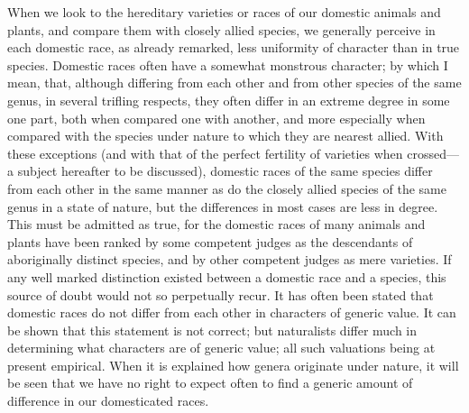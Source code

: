 When we look to the hereditary varieties or races of our
domestic animals and plants, and compare them with closely allied
species, we generally perceive in each domestic race, as already
remarked, less uniformity of character than in true species.
Domestic races often have a somewhat monstrous character; by which
I mean, that, although differing from each other and from other
species of the same genus, in several trifling respects, they often
differ in an extreme degree in some one part, both when compared
one with another, and more especially when compared with the
species under nature to which they are nearest allied. With these
exceptions (and with that of the perfect fertility of varieties
when crossed—a subject hereafter to be discussed), domestic races
of the same species differ from each other in the same manner as do
the closely allied species of the same genus in a state of nature,
but the differences in most cases are less in degree. This must be
admitted as true, for the domestic races of many animals and plants
have been ranked by some competent judges as the descendants of
aboriginally distinct species, and by other competent judges as
mere varieties. If any well marked distinction existed between a
domestic race and a species, this source of doubt would not so
perpetually recur. It has often been stated that domestic races do
not differ from each other in characters of generic value. It can
be shown that this statement is not correct; but naturalists differ
much in determining what characters are of generic value; all such
valuations being at present empirical. When it is explained how
genera originate under nature, it will be seen that we have no
right to expect often to find a generic amount of difference in our
domesticated races.

